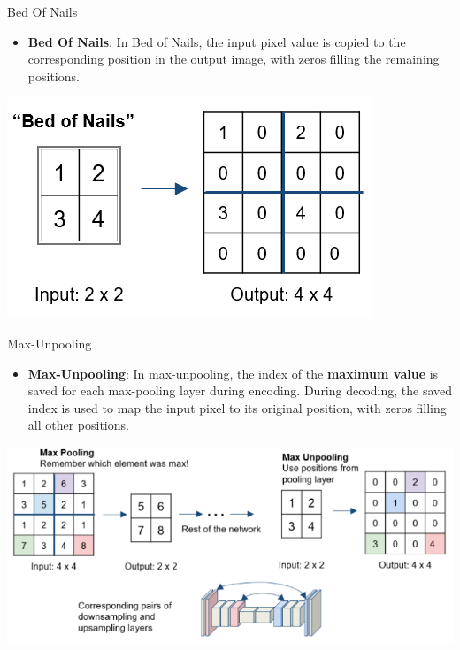 \documentclass[default, aspectratio=169]{beamer}
\begin{document}
	\begin{frame}{Bed Of Nails}
		\vspace{0.5cm}
		\begin{itemize}
			\item \textbf{Bed Of Nails}: In Bed of Nails, the input pixel value is copied to the corresponding position in the output image, with zeros filling the remaining positions.
		\end{itemize}
		
		\centering
		\includegraphics[keepaspectratio, scale=0.4]{pic/Upsamlpe_3.png}
		
	\end{frame}
	\begin{frame}{Max-Unpooling}
		\vspace{0.5cm}
		\begin{itemize}
			\item \textbf{Max-Unpooling}: In max-unpooling, the index of the \textbf{maximum value} is saved for each max-pooling layer during encoding. During decoding, the saved index is used to map the input pixel to its original position, with zeros filling all other positions.
		\end{itemize}
		
		\centering
		\includegraphics[keepaspectratio, scale=0.3]{pic/Upsamlpe_4.png}
	\end{frame}
	
\end{document}
